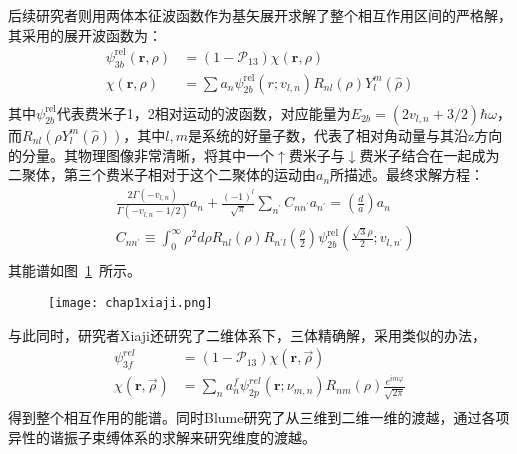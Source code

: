 后续研究者\cite{Xiaji2009prl}则用两体本征波函数作为基矢展开求解了整个相互作用区间的严格解，其采用的展开波函数为：
\begin{equation}
\begin{split}
\psi_{3 b}^{\mathrm{rel}}(\mathbf{r}, \rho)&=\left(1-\mathcal{P}_{13}\right) \chi(\mathbf{r}, \rho)\\
\chi(\mathbf{r}, \rho)&=\sum a_{n} \psi_{2 b}^{\mathrm{rel}}\left(r ; v_{l, n}\right) R_{n l}(\rho) Y_{l}^{m}(\hat{\rho})\\
\end{split}
\end{equation}
其中$\psi_{2 b}^{\mathrm{rel}}$代表费米子1，2相对运动的波函数，对应能量为$E_{2b}=(2v_{l,n}+3/2)\hbar\omega$，而$R_{nl}(\rho Y^m_l(\hat{\rho}))$，其中$l,m$是系统的好量子数，代表了相对角动量与其沿z方向的分量。其物理图像非常清晰，将其中一个$\uparrow$费米子与$\downarrow$费米子结合在一起成为二聚体，第三个费米子相对于这个二聚体的运动由$a_n$所描述。最终求解方程：
\begin{equation}
\begin{split}
&\frac{2 \Gamma\left(-v_{l, n}\right)}{\Gamma\left(-v_{l, n}-1 / 2\right)} a_{n}+\frac{(-1)^{l}}{\sqrt{\pi}} \sum_{n^{\prime}} C_{n n^{\prime}} a_{n^{\prime}}=\left(\frac{d}{a}\right) a_{n}\\
&C_{n n^{\prime}} \equiv \int_{0}^{\infty} \rho^{2} d \rho R_{n l}(\rho) R_{n^{\prime} l}\left(\frac{\rho}{2}\right) \psi_{2 b}^{\mathrm{rel}}\left(\frac{\sqrt{3} \rho}{2} ; v_{l, n^{\prime}}\right)\\
\end{split}
\end{equation}
其能谱如图~\ref{xiaji3d}~所示。
\begin{figure}[!htbp]
    \centering
    \texttt{[image: chap1xiaji.png]}
    \label{xiaji3d}
\end{figure}
与此同时，研究者Xiaji\cite{Xiaji20103b}还研究了二维体系下，三体精确解，采用类似的办法，
\begin{equation}
\begin{split}
\psi_{3 f}^{r e l}&=\left(1-\mathcal{P}_{13}\right) \chi(\mathbf{r}, \vec{\rho})\\
\chi(\mathbf{r}, \vec{\rho})&=\sum_{n} a_{n}^{f} \psi_{2 p}^{r e l}\left(\mathbf{r} ; \nu_{m, n}\right) R_{n m}(\rho) \frac{e^{i m \varphi}}{\sqrt{2 \pi}}\\
\end{split}
\end{equation}
得到整个相互作用的能谱。同时Blume研究了从三维到二维一维的渡越\cite{blume2012}，通过各项异性的谐振子束缚体系的求解来研究维度的渡越。

